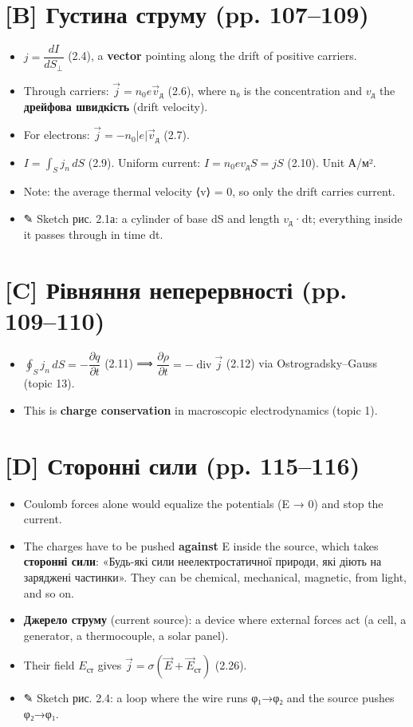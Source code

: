 \documentclass[11pt,a4paper,oneside]{book}
\newcommand{\pen}{{\sffamily\color{accent}✎}}
\begin{document}
\section*{[B] Густина струму (pp. 107–109)}
\begin{itemize}
\item $j = \dfrac{dI}{dS_\perp}$ (2.4), a \textbf{vector} pointing along the drift of positive carriers.
\item Through carriers: $\vec j = n_0 e\vec v_{\text{д}}$ (2.6), where n₀ is the concentration and $v_{\text{д}}$ the \textbf{дрейфова швидкість} (drift velocity).
\item For electrons: $\vec j = -n_0|e|\vec v_{\text{д}}$ (2.7).
\item $I = \int_S j_n\,dS$ (2.9). Uniform current: $I = n_0ev_{\text{д}}S = jS$ (2.10). Unit А/м².
\item Note: the average thermal velocity ⟨v⟩ = 0, so only the drift carries current.
\item \pen{} Sketch рис. 2.1а: a cylinder of base dS and length $v_{\text{д}}$·dt; everything inside it passes through in time dt.
\end{itemize}

\section*{[C] Рівняння неперервності (pp. 109–110)}
\begin{itemize}
\item $\oint_S j_n\,dS = -\dfrac{\partial q}{\partial t}$ (2.11) ⟹ $\dfrac{\partial\rho}{\partial t} = -\operatorname{div}\vec j$ (2.12) via Ostrogradsky–Gauss (topic 13).
\item This is \textbf{charge conservation} in macroscopic electrodynamics (topic 1).
\end{itemize}

\section*{[D] Сторонні сили (pp. 115–116)}
\begin{itemize}
\item Coulomb forces alone would equalize the potentials (E → 0) and stop the current.
\item The charges have to be pushed \textbf{against} E inside the source, which takes \textbf{сторонні сили}: «Будь-які сили неелектростатичної природи, які діють на заряджені частинки». They can be chemical, mechanical, magnetic, from light, and so on.
\item \textbf{Джерело струму} (current source): a device where external forces act (a cell, a generator, a thermocouple, a solar panel).
\item Their field $E_{\text{ст}}$ gives $\vec j = \sigma(\vec E + \vec E_{\text{ст}})$ (2.26).
\item \pen{} Sketch рис. 2.4: a loop where the wire runs φ₁→φ₂ and the source pushes φ₂→φ₁.
\end{itemize}
\end{document}
